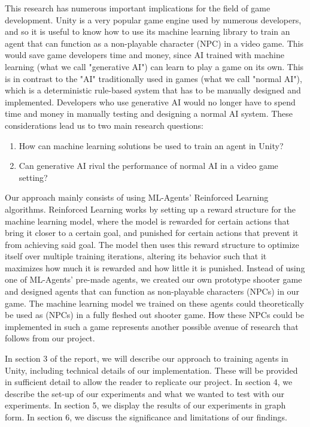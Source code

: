 \documentclass[a4paper,12pt,twocolumn]{article}
\begin{document}
This research has numerous important implications for the field of game development.  Unity is a very popular game engine used by numerous developers, and so it is useful to know how to use its machine learning library to train an agent that can function as a non-playable character (NPC) in a video game. This would save game developers time and money, since AI trained with machine learning (what we call "generative AI") can learn to play a game on its own. This is in contrast to the "AI" traditionally used in games (what we call "normal AI"), which is a deterministic rule-based system that has to be manually designed and implemented. Developers who use generative AI would no longer have to spend time and money in manually testing and designing a normal AI system. These considerations lead us to two main research questions:

\begin{enumerate}
    \item How can machine learning solutions be used to train an agent in Unity?
    \item Can generative AI rival the performance of normal AI in a video game setting? 
\end{enumerate}

Our approach mainly consists of using ML-Agents' Reinforced Learning algorithms. Reinforced Learning works by setting up a reward structure for the machine learning model, where the model is rewarded for certain actions that bring it closer to a certain goal, and punished for certain actions that prevent it from achieving said goal. The model then uses this reward structure to optimize itself over multiple training iterations, altering its behavior such that it maximizes how much it is rewarded and how little it is punished. Instead of using one of ML-Agents' pre-made agents, we created our own prototype shooter game and designed agents that can function as non-playable characters (NPCs) in our game. The machine learning model we trained on these agents could theoretically be used as (NPCs) in a fully fleshed out shooter game. How these NPCs could be implemented in such a game represents another possible avenue of research that follows from our project.

In section 3 of the report, we will describe our approach to training agents in Unity, including technical details of our implementation. These will be provided in sufficient detail to allow the reader to replicate our project. In section 4, we describe the set-up of our experiments and what we wanted to test with our experiments. In section 5, we display the results of our experiments in graph form. In section 6, we discuss the significance and limitations of our findings. 
\end{document}
